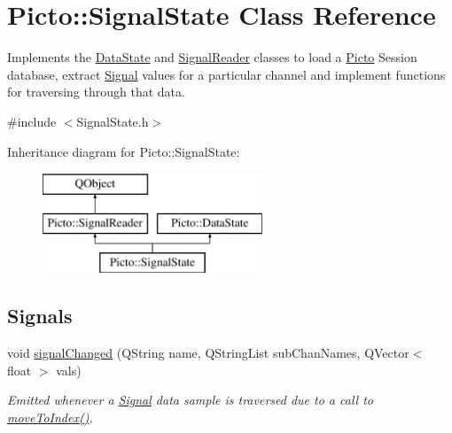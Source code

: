 \hypertarget{class_picto_1_1_signal_state}{\section{Picto\-:\-:Signal\-State Class Reference}
\label{class_picto_1_1_signal_state}
}


Implements the \hyperlink{class_picto_1_1_data_state}{Data\-State} and \hyperlink{class_picto_1_1_signal_reader}{Signal\-Reader} classes to load a \hyperlink{namespace_picto}{Picto} Session database, extract \hyperlink{class_picto_1_1_signal}{Signal} values for a particular channel and implement functions for traversing through that data.  




{\ttfamily \#include $<$Signal\-State.\-h$>$}

Inheritance diagram for Picto\-:\-:Signal\-State\-:\begin{figure}[H]
\begin{center}
\leavevmode
\includegraphics[height=3.000000cm]{class_picto_1_1_signal_state}
\end{center}
\end{figure}
\subsection*{Signals}
\begin{DoxyCompactItemize}
\item 
void \hyperlink{class_picto_1_1_signal_state_ac184ce52fd8ace38fcf780efa6bb35d5}{signal\-Changed} (Q\-String name, Q\-String\-List sub\-Chan\-Names, Q\-Vector$<$ float $>$ vals)
\begin{DoxyCompactList}\small\item\em Emitted whenever a \hyperlink{class_picto_1_1_signal}{Signal} data sample is traversed due to a call to \hyperlink{class_picto_1_1_signal_state_a0b2ecb912382f2e5605d24ffaca7a093}{move\-To\-Index()}. \end{DoxyCompactList}\end{DoxyCompactItemize}
